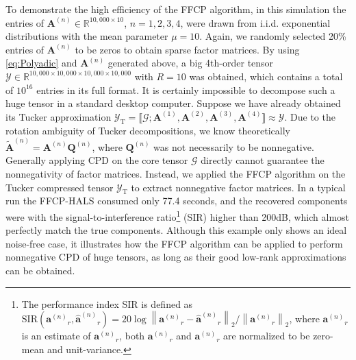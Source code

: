 \documentclass[10pt,twocolumn,twoside]{IEEEtran}
\newcommand{\tensor}[1]{\ensuremath{\boldsymbol{\mathscr{#1}}}}
\newcommand{\matn}[2][n]{\ensuremath{\mathbf{#2}^{(#1)}}}
\newcommand{\tenfactors}[1]{\ensuremath{\llbracket {#1} \rrbracket}}
\newcommand{\Real}{\ensuremath{\mathbb{R}}}
\newcommand{\frob}[2][F]{\ensuremath{\left\|#2\right\|_{#1}}}
\begin{document}
To demonstrate the high efficiency of the FFCP algorithm, in this simulation the entries of $\matn{A}\in\Real^{10,000\times 10}$, $n=1,2,3,4$, were drawn from i.i.d. exponential distributions with the mean parameter $\mu=10$. Again, we randomly selected 20\% entries of \matn{A} to be zeros to obtain sparse factor matrices. By using \eqref{eq:Polyadic} and \matn{A} generated above, a big 4th-order tensor $\tensor{Y}\in\Real^{10,000\times 10,000\times10,000\times10,000}$ with $R=10$ was obtained, which contains a total of $10^{16}$ entries in its full format. It is certainly impossible to decompose such a huge tensor in a standard desktop computer. Suppose we have already obtained its Tucker approximation $\tensor{Y}_{\text{T}}=\tenfactors{\tensor{G};\matn[1]{A},\matn[2]{A},\matn[3]{A},\matn[4]{A}}\approx\tensor{Y}$. Due to the rotation ambiguity of Tucker decompositions, we know theoretically $\matn{\tilde{A}}=\matn{A}\matn{Q}$, where \matn{Q} was not necessarily to be nonnegative. Generally applying CPD on the core tensor \tensor{G} directly cannot guarantee the nonnegativity of factor matrices. Instead, we applied the FFCP algorithm on the Tucker compressed tensor $\tensor{Y}_{\text{T}}$ to extract nonnegative factor matrices. In a typical run the FFCP-HALS consumed only 77.4 seconds, and the recovered components were with the signal-to-interference ratio\footnote{The performance index SIR is defined as $\text{SIR}(\matn{a}_r,\matn{\hat{a}}_r)=20\log{\frob[2]{\matn{a}_r-\matn{\hat{a}}_r}}/{\frob[2]{\matn{a}_r}}$, where $\matn{a}_r$ is an estimate of $\matn{a}_r$, both $\matn{a}_r$ and $\matn{a}_r$ are normalized to be zero-mean and unit-variance.} (SIR) higher than 200dB, which almost perfectly match the true components. Although this example only shows an ideal noise-free case, it illustrates how the FFCP algorithm can be applied to perform nonnegative CPD of huge tensors, as long as their good low-rank approximations can be obtained.
\end{document}
